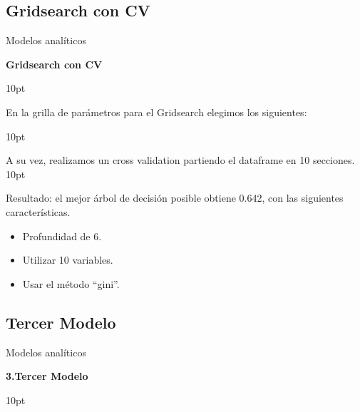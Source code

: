 \documentclass[pdf]{beamer}
\def\vspace{}%
\begin{document}
{    \subsection{Gridsearch con CV}

\begin{frame}{Modelos analíticos}
    \begin{Large}
        \textbf{Gridsearch con CV}
    \end{Large}
    \vspace{10pt}
    
    En la grilla de parámetros para el Gridsearch elegimos los siguientes:
    \begin{itemize}
    \end{itemize}
    \vspace{10pt}

    A su vez, realizamos un cross validation partiendo el dataframe en 10 secciones.
    \vspace{10pt}

    Resultado: el mejor árbol de decisión posible obtiene 0.642, con las siguientes características.
    
    \begin{itemize}
        \item Profundidad de  6.
        \item Utilizar  10  variables.
        \item Usar el método ``gini''.
    \end{itemize}
\end{frame}

    \subsection{Tercer Modelo}

\begin{frame}{Modelos analíticos}
    
    \begin{Large}
        \textbf{3.Tercer Modelo}
    \end{Large}
    \vspace{10pt}


\end{frame}}
\end{document}
